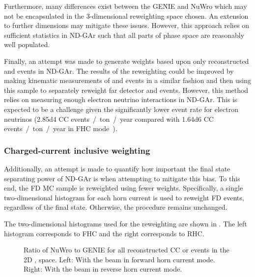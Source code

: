 Furthermore, many differences exist between the GENIE and NuWro which may not be encapsulated in the 3-dimensional reweighting space chosen.
An extension to further dimensions may mitigate these issues.
However, this approach relies on sufficient statistics in ND-GAr such that all parts of phase space are reasonably well populated.

Finally, an attempt was made to generate weights based upon only reconstructed \numu and \anumu events in ND-GAr.
The results of the reweighting could be improved by making kinematic measurements of \nue and \anue events in a similar fashion and then using this sample to separately reweight far detector \nue and \anue events.
However, this method relies on measuring enough electron neutrino interactions in ND-GAr.
This is expected to be a challenge given the significantly lower event rate for electron neutrinos (\num{2.85d4} CC events~/~ton~/~year compared with \num{1.64d6} \numu CC events~/~ton~/~year in FHC mode~\cite{ndCdr}).

\subsubsection{Charged-current inclusive weighting}

Additionally, an attempt is made to quantify how important the final state separating power of ND-GAr is when attempting to mitigate this bias.
To this end, the FD MC sample is reweighted using fewer weights.
Specifically, a single two-dimensional histogram for each horn current is used to reweight FD events, regardless of the final state. 
Otherwise, the procedure remains unchanged.

The two-dimensional histograms used for the reweighting are shown in . 
The left histogram corresponds to FHC and the right corresponds to RHC.

\begin{figure}[h]
	\begin{minipage}[t]{.5\linewidth}
		\begin{adjustbox}{max totalsize=\linewidth, center}
			
		\end{adjustbox}
	\end{minipage}
	\hfill
	\begin{minipage}[t]{.5\linewidth}
		\begin{adjustbox}{max totalsize=\linewidth, center}
			
		\end{adjustbox}
	\end{minipage}
	\caption[CC inclusive ratio of NuWro to GENIE in \evis and \pvis for FHC and RHC]{Ratio of NuWro to GENIE for all reconstructed CC \numu or \anumu events in the 2D \evis, \pvis space. Left: With the beam in forward horn current mode. Right: With the beam in reverse horn current mode.}
	\label{fig:ccIncWeightingHists}
\end{figure}

